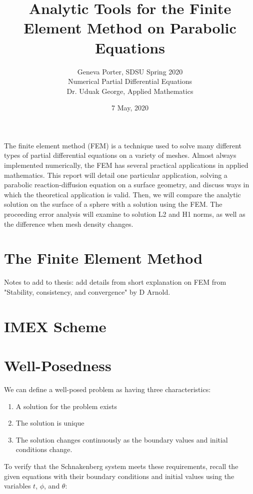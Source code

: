 \documentclass[12pt]{article}
\title{Analytic Tools for the Finite Element Method on Parabolic Equations}
\author{Geneva Porter, SDSU Spring 2020\\ 
Numerical Partial Differential Equations\\
Dr. Uduak George, Applied Mathematics}
\date{7 May, 2020}
\begin{document}
\maketitle

The finite element method (FEM) is a technique used to solve many different types of partial differential equations on a variety of meshes. Almost always implemented numerically, the FEM has several practical applications in applied mathematics. This report will detail one particular application, solving a parabolic reaction-diffusion equation on a surface geometry, and discuss ways in which the theoretical application is valid. Then, we will compare the analytic solution on the surface of a sphere with a solution using the FEM. The proceeding error analysis will examine to solution L2 and H1 norms, as well as the difference when mesh density changes.

\section{The Finite Element Method}

Notes to add to thesis: add details from short explanation on FEM from "Stability, consistency, and convergence" by D Arnold.

\section{IMEX Scheme}

\section{Well-Posedness}

We can define a well-posed problem as having three characteristics:

\begin{enumerate}
	\item A solution for the problem exists
	\item The solution is unique
	\item The solution changes continuously as the boundary values and initial conditions change.
\end{enumerate}

To verify that the Schnakenberg system meets these requirements, recall the given equations with their boundary conditions and initial values using the variables $t$, $\phi$, and $\theta$:
\end{document}
